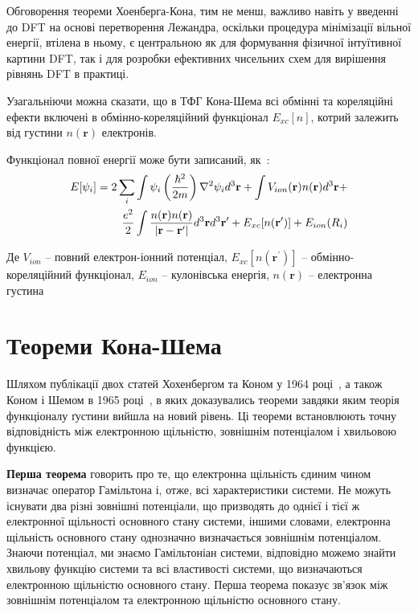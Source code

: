 Обговорення теореми Хоенберга-Кона, тим не менш, важливо навіть у введенні до DFT на основі перетворення Лежандра, оскільки процедура мінімізації вільної енергії, втілена в ньому, є центральною як для формування фізичної інтуїтивної картини DFT, так і для розробки ефективних чисельних схем для вирішення рівнянь DFT в практиці.

Узагальніючи можна сказати, що в ТФГ Кона-Шема всі обмінні та кореляційні ефекти включені в обмінно-кореляційний функціонал $E_{xc}[n]$, котрий залежить від густини $n(\textbf{r})$ електронів. 


Функціонал повної енергії може бути записаний, як~\cite{K-S energy}:
\begin{eqnarray}
 E[\psi_i] = 2\sum\limits_{i}\int\psi_i\left({{\hbar^2}\over{2m}}\right)\nabla^2\psi_id^3\textbf{r}+\int V_{ion}(\textbf{r})n(\textbf{r})d^3\textbf{r}+\nonumber \\
 {{e^2}\over{2}}\int {{n(\textbf{r})n(\textbf{r})}\over{|\textbf{r}-\textbf{r}^\prime|}}d^3\textbf{r}d^3\textbf{r}^\prime+E_{xc}[n(\textbf{r}^\prime)]+E_{ion}(R_i)
\end{eqnarray}

Де $V_{ion}$ -- повний електрон-іонний потенціал, $E_{xc}[n(\textbf{r}^\prime)]$ -- обмінно-кореляційний функціонал, $E_{ion}$ -- кулонівська енергія, $n(\textbf{r})$ -- електронна густина

\section{Теореми Кона-Шема}
Шляхом публікації двох статей Хохенбергом та Коном у 1964 році~\cite{Hohenberg&Khon}, а також Коном і Шемом в 1965 році~\cite{Khon&Sham}, в яких доказувались теореми завдяки яким теорія функціоналу ґустини вийшла на новий рівень. Ці теореми встановлюють точну відповідність між електронною щільністю, зовнішнім потенціалом і хвильовою функцією.

\textbf{Перша теорема} говорить про те, що електронна щільність єдиним чином визначає оператор Гамільтона і, отже, всі характеристики системи.
Не можуть існувати два різні зовнішні потенціали, що призводять до однієї і тієї ж електронної щільності основного стану системи, іншими словами, електронна щільність основного стану однозначно визначається зовнішнім потенціалом.
Знаючи потенціал, ми знаємо Гамільтоніан системи, відповідно можемо знайти хвильову функцію системи та всі властивості системи, що визначаються електронною щільністю основного стану. Перша теорема показує зв'язок між зовнішнім потенціалом та електронною щільністю основного стану.

